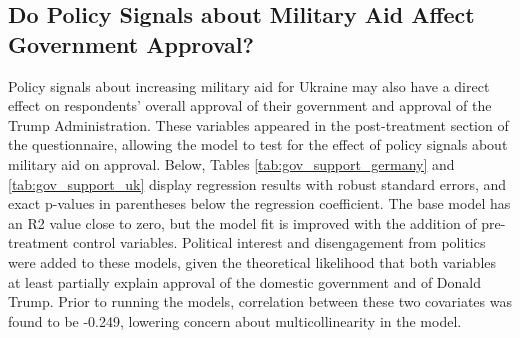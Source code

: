 \begin{appendices}
\subsection{Do Policy Signals about Military Aid Affect Government Approval?}
Policy signals about increasing military aid for Ukraine may also have a direct effect on respondents' overall approval of their government and approval of the Trump Administration. These variables appeared in the post-treatment section of the questionnaire, allowing the model to test for the effect of policy signals about military aid on approval. Below, Tables \ref{tab:gov_support_germany} and \ref{tab:gov_support_uk} display regression results with robust standard errors, and exact p-values in parentheses below the regression coefficient. The base model has an R2 value close to zero, but the model fit is improved with the addition of pre-treatment control variables. Political interest and disengagement from politics were added to these models, given the theoretical likelihood that both variables at least partially explain approval of the domestic government and of Donald Trump. Prior to running the models, correlation between these two covariates was found to be -0.249, lowering concern about multicollinearity in the model. 


\end{appendices}
